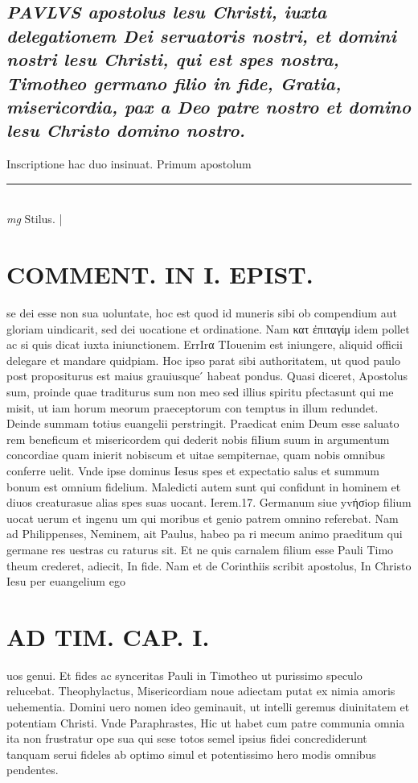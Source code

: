 \documentclass{article}
\begin{document}
\begin{pages}
\subsection*{\textit{\huge\textbf{P}\normalsize AVLVS apostolus lesu Christi, iuxta delegationem Dei seruatoris nostri, et domini nostri lesu Christi, qui est spes nostra, Timotheo germano filio in fide, Gratia, misericordia, pax a Deo patre nostro et domino lesu Christo domino nostro. }}\pstart Inscriptione hac duo insinuat. Primum apostolum  \pend
\vspace{0.5cm}\noindent
\vspace{0.2cm}\rule{1cm}{0.2pt}\\ 
\hspace{0.2cm}\textit{mg}
\footnotesize Stilus. 
\normalsize| 
\section*{COMMENT. IN I. EPIST. }\pstart se dei esse non sua uoluntate, hoc est quod id muneris sibi ob compendium aut gloriam uindicarit, sed dei uocatione et ordinatione. Nam κατ ἐπιταγίμ idem pollet ac si quis dicat iuxta iniunctionem. ErrIrα TIouenim est iniungere, aliquid officii delegare et mandare quidpiam. Hoc ipso parat sibi authoritatem, ut quod paulo post propositurus est maius grauiusque ́ habeat pondus. Quasi diceret, Apostolus sum, proinde quae traditurus sum non meo sed illius spiritu pfectasunt qui me misit, ut iam horum meorum praeceptorum con temptus in illum redundet. Deinde summam totius euangelii perstringit. Praedicat enim Deum esse saluato rem beneficum et misericordem qui dederit nobis fiIium suum in argumentum concordiae quam inierit nobiscum et uitae sempiternae, quam nobis omnibus conferre uelit. Vnde ipse dominus Iesus spes et expectatio salus et summum bonum est omnium fidelium. Maledicti autem sunt qui confidunt in hominem et diuos creaturasue alias spes suas uocant. Ierem.17. Germanum siue yvήσiop filium uocat uerum et ingenu um qui moribus et genio patrem omnino referebat. Nam ad Philippenses, Neminem, ait Paulus, habeo pa ri mecum animo praeditum qui germane res uestras cu raturus sit. Et ne quis carnalem filium esse Pauli Timo theum crederet, adiecit, In fide. Nam et de Corinthiis scribit apostolus, In Christo Iesu per euangelium ego  \pend
\section*{AD TIM. CAP. I. }
\marginpar{[ p.95 ]}\pstart uos genui. Et fides ac synceritas Pauli in Timotheo ut purissimo speculo relucebat. Theophylactus, Misericordiam noue adiectam putat ex nimia amoris uehementia. Domini uero nomen ideo geminauit, ut intelli geremus diuinitatem et potentiam Christi. Vnde Paraphrastes, Hic ut habet cum patre communia omnia ita non frustratur ope sua qui sese totos semel ipsius fidei concrediderunt tanquam serui fideles ab optimo simul et potentissimo hero modis omnibus pendentes.  \pend
{}
{}

\end{pages}
\end{document}

